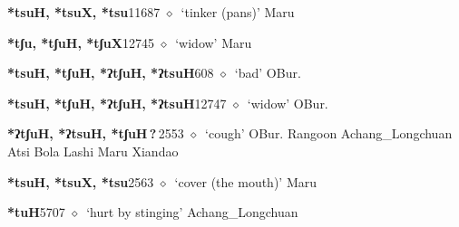 \begin{list}{}{\leftmargin=1.5em \itemindent=-1.5em}
  \item {\footnotesize \textbf{*tsuH, *tsuX, *tsu}}{\tiny 11687}
\hspace{1ex}
         $\diamond$~`tinker (pans)'
         Maru 
  \item {\footnotesize \textbf{*tʃu, *tʃuH, *tʃuX}}{\tiny 12745}
\hspace{1ex}
         $\diamond$~`widow'
         Maru 
  \item {\footnotesize \textbf{*tsuH, *tʃuH, *ʔtʃuH, *ʔtsuH}}{\tiny 608}
\hspace{1ex}
         $\diamond$~`bad'
         OBur. 
  \item {\footnotesize \textbf{*tsuH, *tʃuH, *ʔtʃuH, *ʔtsuH}}{\tiny 12747}
\hspace{1ex}
         $\diamond$~`widow'
         OBur. 
  \item {\footnotesize \textbf{*ʔtʃuH, *ʔtsuH, *tʃuH\,?\,}}{\tiny 2553}
\hspace{1ex}
         $\diamond$~`cough'
         OBur. 
\hspace{1ex}
         Rangoon 
\hspace{1ex}
         Achang\_Longchuan 
\hspace{1ex}
         Atsi 
\hspace{1ex}
         Bola 
\hspace{1ex}
         Lashi 
\hspace{1ex}
         Maru 
\hspace{1ex}
         Xiandao 
  \item {\footnotesize \textbf{*tsuH, *tsuX, *tsu}}{\tiny 2563}
\hspace{1ex}
         $\diamond$~`cover (the mouth)'
         Maru 
  \item {\footnotesize \textbf{*tuH}}{\tiny 5707}
\hspace{1ex}
         $\diamond$~`hurt by stinging'
         Achang\_Longchuan 

\end{list}
